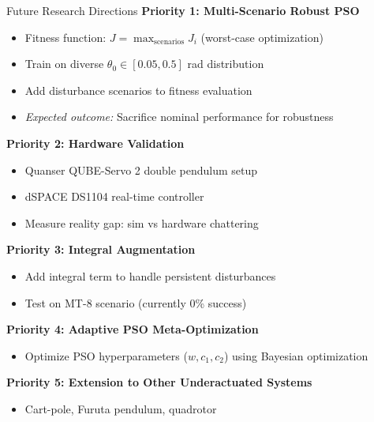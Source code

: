 \documentclass[10pt,aspectratio=169]{beamer}
\begin{document}
\begin{frame}{Future Research Directions}
\textbf{Priority 1: Multi-Scenario Robust PSO}
\begin{itemize}
    \item Fitness function: $J = \max_{\text{scenarios}} J_i$ (worst-case optimization)
    \item Train on diverse $\theta_0 \in [0.05, 0.5]$ rad distribution
    \item Add disturbance scenarios to fitness evaluation
    \item \textit{Expected outcome:} Sacrifice nominal performance for robustness
\end{itemize}

\textbf{Priority 2: Hardware Validation}
\begin{itemize}
    \item Quanser QUBE-Servo 2 double pendulum setup
    \item dSPACE DS1104 real-time controller
    \item Measure reality gap: sim vs hardware chattering
\end{itemize}

\textbf{Priority 3: Integral Augmentation}
\begin{itemize}
    \item Add integral term to handle persistent disturbances
    \item Test on MT-8 scenario (currently 0\% success)
\end{itemize}

\textbf{Priority 4: Adaptive PSO Meta-Optimization}
\begin{itemize}
    \item Optimize PSO hyperparameters ($w, c_1, c_2$) using Bayesian optimization
\end{itemize}

\textbf{Priority 5: Extension to Other Underactuated Systems}
\begin{itemize}
    \item Cart-pole, Furuta pendulum, quadrotor
\end{itemize}
\end{frame}
\end{document}
